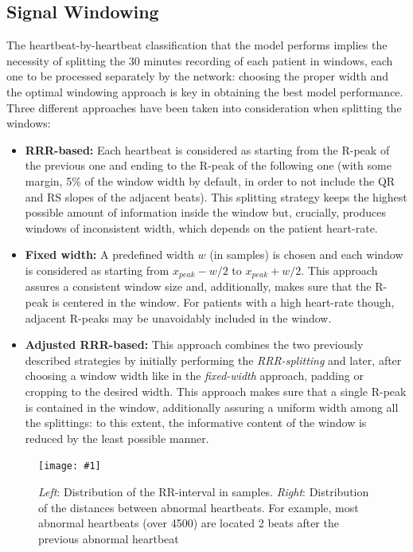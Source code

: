 \documentclass[conference]{IEEEtran}
\newcommand{\addfigure}[3]{
    \begin{figure}
        \texttt{[image: \#1]}
        \caption{#2}
        \label{#3}
    \end{figure}
}
\begin{document}
\subsection{Signal Windowing}
    The heartbeat-by-heartbeat classification that the model performs implies the
    necessity of splitting the 30 minutes recording of each patient in windows, each
    one to be processed separately by the network:
    choosing the proper width and the optimal windowing approach is key in
    obtaining the best model performance. Three different approaches have been taken
    into consideration when splitting the windows:
    \begin{itemize}
        \item \textbf{RRR-based: }Each heartbeat is considered as starting from
        the R-peak of the previous one and ending to the R-peak of the
        following one (with some margin, 5\% of the window width by default, in
        order to not include the QR and RS
        slopes of the adjacent beats). This splitting strategy keeps the highest
        possible amount of information inside the
        window but, crucially,
        produces windows of inconsistent width, which depends on the patient
        heart-rate.
        \item \textbf{Fixed width: }A predefined width $w$ (in samples) is
        chosen and each window is considered as starting from $x_{peak}-w/2$ to
        $x_{peak}+w/2$. This approach assures a consistent window size and,
        additionally, makes sure that the R-peak is centered in the window. For
        patients with a high heart-rate though, adjacent R-peaks may be
        unavoidably included in the window.
        \item \textbf{Adjusted RRR-based: }This approach combines the two
        previously described strategies by initially performing the \textit{RRR-splitting} and
        later, after choosing a window width like in the
        \textit{fixed-width} approach, padding or cropping to the desired width.
        This approach makes sure that a single R-peak is contained in the
        window, additionally assuring a uniform width among all the splittings:
        to this extent, the informative content of the window is reduced by the
        least possible manner. 
    \end{itemize}

    \addfigure
        {img/histograms.jpg}
        {\textit{Left}: Distribution of the RR-interval in samples.
        \textit{Right}: Distribution of the distances between abnormal
        heartbeats. For example, most abnormal heartbeats (over 4500) are
        located 2 beats after the previous abnormal heartbeat }
        {fig:hists}
\end{document}
